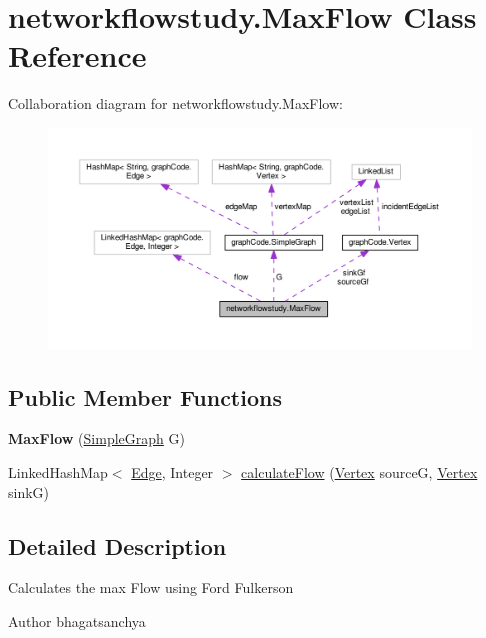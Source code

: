 \hypertarget{classnetworkflowstudy_1_1MaxFlow}{}\section{networkflowstudy.\+Max\+Flow Class Reference}
\label{classnetworkflowstudy_1_1MaxFlow}


Collaboration diagram for networkflowstudy.\+Max\+Flow\+:\nopagebreak
\begin{figure}[H]
\begin{center}
\leavevmode
\includegraphics[width=350pt]{classnetworkflowstudy_1_1MaxFlow__coll__graph}
\end{center}
\end{figure}
\subsection*{Public Member Functions}
\begin{DoxyCompactItemize}
\item 
{\bfseries Max\+Flow} (\hyperlink{classgraphCode_1_1SimpleGraph}{Simple\+Graph} G)\hypertarget{classnetworkflowstudy_1_1MaxFlow_a117178d28cedbcc7ff80b2bb6e160b29}{}\label{classnetworkflowstudy_1_1MaxFlow_a117178d28cedbcc7ff80b2bb6e160b29}

\item 
Linked\+Hash\+Map$<$ \hyperlink{classgraphCode_1_1Edge}{Edge}, Integer $>$ \hyperlink{classnetworkflowstudy_1_1MaxFlow_af4305363e5a4a606d03af69726bc00f9}{calculate\+Flow} (\hyperlink{classgraphCode_1_1Vertex}{Vertex} sourceG, \hyperlink{classgraphCode_1_1Vertex}{Vertex} sinkG)
\end{DoxyCompactItemize}


\subsection{Detailed Description}
Calculates the max Flow using Ford Fulkerson \begin{DoxyAuthor}{Author}
bhagatsanchya 
\end{DoxyAuthor}


